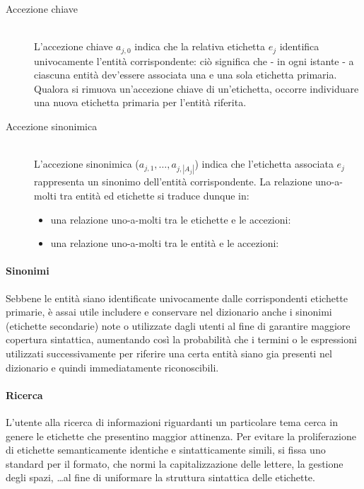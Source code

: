 \begin{description}
	\item[Accezione chiave] \hfill \\
	L'accezione chiave $a_{j,0}$ indica che la relativa etichetta $e_j$ identifica univocamente l'entità corrispondente: ciò significa che - in ogni istante - a ciascuna entità dev'essere associata una e una sola etichetta primaria. Qualora si rimuova un'accezione chiave di un'etichetta, occorre individuare una nuova etichetta primaria per l'entità riferita.
	\item[Accezione sinonimica] \hfill \\
	L'accezione sinonimica ($a_{j,1},\ldots,a_{j,\left|A_j\right|}$) indica che l'etichetta associata $e_j$ rappresenta un sinonimo dell'entità corrispondente. La relazione uno-a-molti tra entità ed etichette si traduce dunque in:
	\begin{itemize}
		\item una relazione uno-a-molti tra le etichette e le accezioni:
		\item una relazione uno-a-molti tra le entità e le accezioni:
	\end{itemize}
\end{description}

\paragraph{Sinonimi}
Sebbene le entità siano identificate univocamente dalle corrispondenti etichette primarie, è assai utile includere e conservare nel dizionario anche i sinonimi (etichette secondarie) note o utilizzate dagli utenti al fine di garantire maggiore copertura sintattica, aumentando così la probabilità che i termini o le espressioni utilizzati successivamente per riferire una certa entità siano gia presenti nel dizionario e quindi immediatamente riconoscibili.

\paragraph{Ricerca}
L'utente alla ricerca di informazioni riguardanti un particolare tema cerca in genere le etichette che presentino maggior attinenza. Per evitare la proliferazione di etichette semanticamente identiche e sintatticamente simili, si fissa uno standard per il formato, che normi la capitalizzazione delle lettere, la gestione degli spazi, \ldots al fine di uniformare la struttura sintattica delle etichette.

